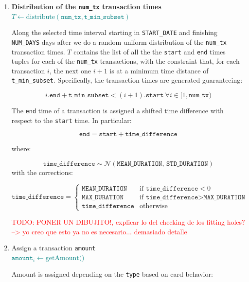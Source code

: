 \begin{enumerate}
    \item \textbf{Distribution of the \texttt{num\_tx} transaction times} \\
     {\footnotesize \textcolor{teal}{$T \gets \text{distribute}(\texttt{num\_tx}, \texttt{t\_min\_subset})$}}
    
    Along the selected time interval starting in \texttt{START\_DATE} and finishing \texttt{NUM\_DAYS} days after we do a random uniform distribution of the \texttt{num\_tx} transaction times. $T$ contains the list of all the the \texttt{start} and \texttt{end} times tuples for each of the \texttt{num\_tx} transactions, with the constraint that, for each transaction $i$, the next one $i+1$ is at a minimum time distance of \texttt{t\_min\_subset}. Specifically, the transaction times are generated guaranteeing:

    $$i.\texttt{end} + \texttt{t\_min\_subset} < (i+1).\texttt{start} \ \forall i \in [1,\texttt{num\_tx})$$

    The \texttt{end} time of a transaction is assigned a shifted time difference with respect to the \texttt{start} time. In particular:

    $$
    \texttt{end} = \texttt{start} + \texttt{time\_difference}
    $$

    where:

    $$\texttt{time\_difference} \sim \mathcal{N}(\texttt{MEAN\_DURATION},\,\texttt{STD\_DURATION})$$ with the corrections:

    $$
    \texttt{time\_difference} =
    \begin{cases} 
        \texttt{MEAN\_DURATION} & \text{if } \texttt{time\_difference} < 0 \\
        \texttt{MAX\_DURATION} & \text{if } \texttt{time\_difference} > \texttt{MAX\_DURATION} \\
        \texttt{time\_difference} & \text{otherwise}
    \end{cases}
    $$

\textcolor{red}{TODO: PONER UN DIBUJITO!, explicar lo del checking de los fitting holes? --> yo creo que esto ya no es necesario... demasiado detalle}


  \item Assign a transaction \texttt{amount}\\
  {\footnotesize \textcolor{teal}{$\texttt{amount}_{i} \gets \text{getAmount()}$}}
  
  Amount is assigned depending on the \texttt{type} based on card behavior:
    

\end{enumerate}
